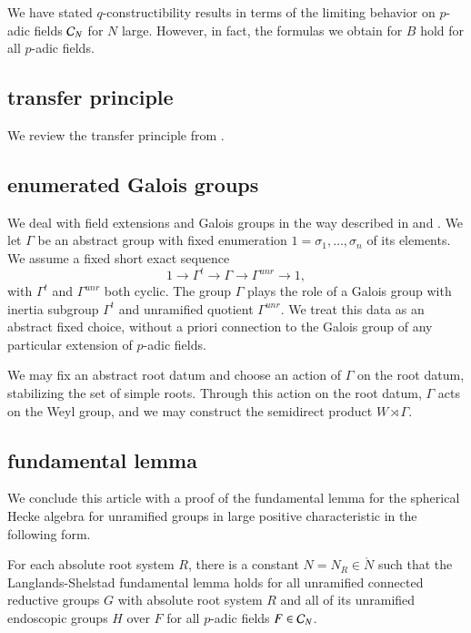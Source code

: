 \begin{remark}  
  We have stated $q$-constructibility results in terms of the limiting
  behavior on $p$-adic fields $\mathcal C_N$ for $N$ large.  However, in fact,
  the formulas we obtain for $B$ hold for all $p$-adic fields.
\end{remark}


\subsection{transfer principle}\label{sec:transfer}

We review the transfer principle from
\cite{cluckers2010constructible}.

\subsection{enumerated Galois groups}

We deal with field extensions and Galois groups in the way described
in \cite{gordon} and \cite{cluckers2011transfer}.  We let $\Gamma$ be
an abstract group with fixed enumeration $1=\sigma_1,\ldots,\sigma_n$
of its elements.  We assume a fixed short exact sequence
\[
1\to \Gamma^t\to\Gamma\to\Gamma^{unr}\to 1,
\]
with $\Gamma^t$ and $\Gamma^{unr}$ both cyclic.  The group $\Gamma$
plays the role of a Galois group with inertia subgroup $\Gamma^t$ and
unramified quotient $\Gamma^{unr}$.  We treat this data as an abstract
fixed choice, without a priori connection to the Galois group of any
particular extension of $p$-adic fields.

We may fix an abstract root datum and choose an action of $\Gamma$ on
the root datum, stabilizing the set of simple roots.  Through this
action on the root datum, $\Gamma$ acts on the Weyl group, and we may
construct the semidirect product $W\rtimes \Gamma$.


\subsection{fundamental lemma}

We conclude this article with a proof of the fundamental lemma for the
spherical Hecke algebra for unramified groups in large positive
characteristic in the following form.

\begin{theorem} \label{thm:fl} For each absolute root system $R$,
  there is a constant $N=N_R\in\ring{N}$ such that the
  Langlands-Shelstad fundamental lemma holds for all unramified
  connected reductive groups $G$ with absolute root system $R$ and all
  of its unramified endoscopic groups $H$ over $F$ for all
  $p$-adic fields $F\in \mathcal C_N$.
\end{theorem}

